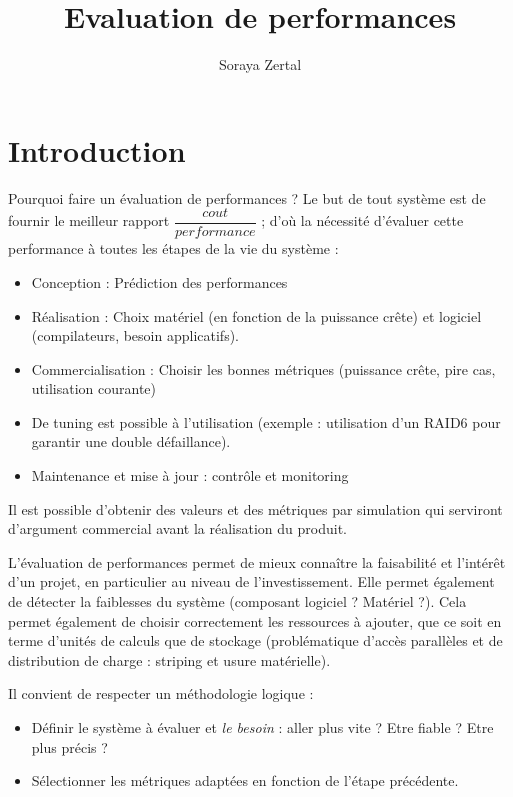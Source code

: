 \documentclass{article}
\title{Evaluation de performances}
\author{Soraya Zertal}
\date{}
\begin{document}
\maketitle
\tableofcontents
\newpage

\section{Introduction}

Pourquoi faire un évaluation de performances ? Le but de tout système est de fournir le meilleur rapport $\dfrac{cout}{performance}$ ; d'où la nécessité d'évaluer cette performance à toutes les étapes de la vie du système :
\begin{itemize}
\item Conception : Prédiction des performances
\item Réalisation : Choix matériel (en fonction de la puissance crête) et logiciel (compilateurs, besoin applicatifs).
\item Commercialisation : Choisir les bonnes métriques (puissance crête, pire cas, utilisation courante)
\item De tuning est possible à l'utilisation (exemple : utilisation d'un RAID6 pour garantir une double défaillance).
\item Maintenance et mise à jour : contrôle et monitoring
\end{itemize}

Il est possible d'obtenir des valeurs et des métriques par simulation qui serviront d'argument commercial avant la réalisation du produit.

L'évaluation de performances permet de mieux connaître la faisabilité et l'intérêt d'un projet, en particulier au niveau de l'investissement. Elle permet également de détecter la faiblesses du système (composant logiciel ? Matériel ?). Cela permet également de choisir correctement les ressources à ajouter, que ce soit en terme d'unités de calculs que de stockage (problématique d'accès parallèles et de distribution de charge : striping et usure matérielle).
\bigskip

Il convient de respecter un méthodologie logique :
\begin{itemize}
\item Définir le système à évaluer et \emph{le besoin} : aller plus vite ? Etre fiable ? Etre plus précis ?
\item Sélectionner les métriques adaptées en fonction de l'étape précédente.
\end{itemize}
\end{document}
